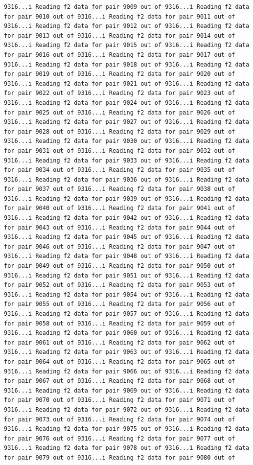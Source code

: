 \documentclass[
]{article}
\begin{document}
\begin{verbatim}
9316...i Reading f2 data for pair 9009 out of 9316...i Reading f2 data for pair 9010 out of 9316...i Reading f2 data for pair 9011 out of 9316...i Reading f2 data for pair 9012 out of 9316...i Reading f2 data for pair 9013 out of 9316...i Reading f2 data for pair 9014 out of 9316...i Reading f2 data for pair 9015 out of 9316...i Reading f2 data for pair 9016 out of 9316...i Reading f2 data for pair 9017 out of 9316...i Reading f2 data for pair 9018 out of 9316...i Reading f2 data for pair 9019 out of 9316...i Reading f2 data for pair 9020 out of 9316...i Reading f2 data for pair 9021 out of 9316...i Reading f2 data for pair 9022 out of 9316...i Reading f2 data for pair 9023 out of 9316...i Reading f2 data for pair 9024 out of 9316...i Reading f2 data for pair 9025 out of 9316...i Reading f2 data for pair 9026 out of 9316...i Reading f2 data for pair 9027 out of 9316...i Reading f2 data for pair 9028 out of 9316...i Reading f2 data for pair 9029 out of 9316...i Reading f2 data for pair 9030 out of 9316...i Reading f2 data for pair 9031 out of 9316...i Reading f2 data for pair 9032 out of 9316...i Reading f2 data for pair 9033 out of 9316...i Reading f2 data for pair 9034 out of 9316...i Reading f2 data for pair 9035 out of 9316...i Reading f2 data for pair 9036 out of 9316...i Reading f2 data for pair 9037 out of 9316...i Reading f2 data for pair 9038 out of 9316...i Reading f2 data for pair 9039 out of 9316...i Reading f2 data for pair 9040 out of 9316...i Reading f2 data for pair 9041 out of 9316...i Reading f2 data for pair 9042 out of 9316...i Reading f2 data for pair 9043 out of 9316...i Reading f2 data for pair 9044 out of 9316...i Reading f2 data for pair 9045 out of 9316...i Reading f2 data for pair 9046 out of 9316...i Reading f2 data for pair 9047 out of 9316...i Reading f2 data for pair 9048 out of 9316...i Reading f2 data for pair 9049 out of 9316...i Reading f2 data for pair 9050 out of 9316...i Reading f2 data for pair 9051 out of 9316...i Reading f2 data for pair 9052 out of 9316...i Reading f2 data for pair 9053 out of 9316...i Reading f2 data for pair 9054 out of 9316...i Reading f2 data for pair 9055 out of 9316...i Reading f2 data for pair 9056 out of 9316...i Reading f2 data for pair 9057 out of 9316...i Reading f2 data for pair 9058 out of 9316...i Reading f2 data for pair 9059 out of 9316...i Reading f2 data for pair 9060 out of 9316...i Reading f2 data for pair 9061 out of 9316...i Reading f2 data for pair 9062 out of 9316...i Reading f2 data for pair 9063 out of 9316...i Reading f2 data for pair 9064 out of 9316...i Reading f2 data for pair 9065 out of 9316...i Reading f2 data for pair 9066 out of 9316...i Reading f2 data for pair 9067 out of 9316...i Reading f2 data for pair 9068 out of 9316...i Reading f2 data for pair 9069 out of 9316...i Reading f2 data for pair 9070 out of 9316...i Reading f2 data for pair 9071 out of 9316...i Reading f2 data for pair 9072 out of 9316...i Reading f2 data for pair 9073 out of 9316...i Reading f2 data for pair 9074 out of 9316...i Reading f2 data for pair 9075 out of 9316...i Reading f2 data for pair 9076 out of 9316...i Reading f2 data for pair 9077 out of 9316...i Reading f2 data for pair 9078 out of 9316...i Reading f2 data for pair 9079 out of 9316...i Reading f2 data for pair 9080 out of 
\end{verbatim}
\end{document}
